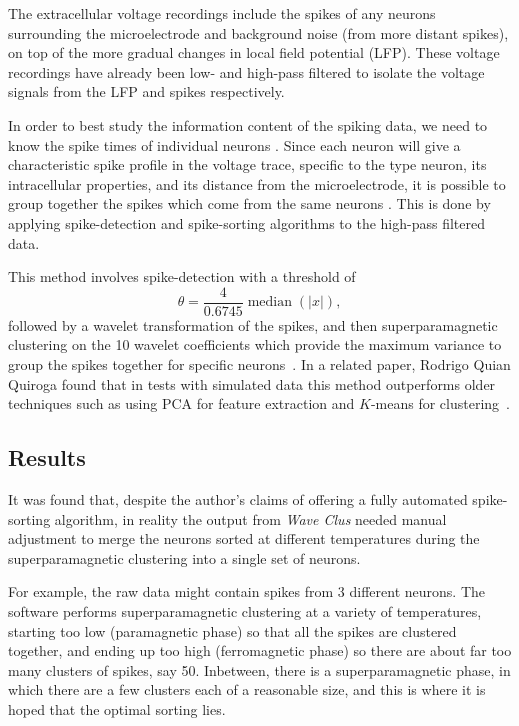 The extracellular voltage recordings include the spikes of any neurons surrounding the microelectrode and background noise (from more distant spikes), on top of the more gradual changes in local field potential (LFP). These voltage recordings have already been low- and high-pass filtered to isolate the voltage signals from the LFP and spikes respectively.

In order to best study the information content of the spiking data, we need to know the spike times of individual neurons \cite{Quiroga2009}. Since each neuron will give a characteristic spike profile in the voltage trace, specific to the type neuron, its intracellular properties, and its distance from the microelectrode, it is possible to group together the spikes which come from the same neurons \cite{Quiroga2007}.
This is done by applying spike-detection and spike-sorting algorithms to the high-pass filtered data.

This method involves spike-detection with a threshold of
$$
\theta
= \frac{4}{0.6745} \operatorname{median} \left( |x| \right)
,$$
followed by a wavelet transformation of the spikes, and then superparamagnetic clustering on the 10 wavelet coefficients which provide the maximum variance to group the spikes together for specific neurons~\cite{Quiroga2004}.
In a related paper, Rodrigo Quian Quiroga \etal{} found that in tests with simulated data this method outperforms older techniques such as using PCA for feature extraction and $K$-means for clustering~\cite{Quiroga2004}.

\subsection{Results}
\label{sec:sorting-result}

It was found that, despite the author's claims of offering a fully automated spike-sorting algorithm, in reality the output from \textit{Wave Clus} needed manual adjustment to merge the neurons sorted at different temperatures during the superparamagnetic clustering into a single set of neurons.

For example, the raw data might contain spikes from 3 different neurons. The software performs superparamagnetic clustering at a variety of temperatures, starting too low (paramagnetic phase) so that all the spikes are clustered together, and ending up too high (ferromagnetic phase) so there are about far too many clusters of spikes, say 50. Inbetween, there is a superparamagnetic phase, in which there are a few clusters each of a reasonable size, and this is where it is hoped that the optimal sorting lies.

